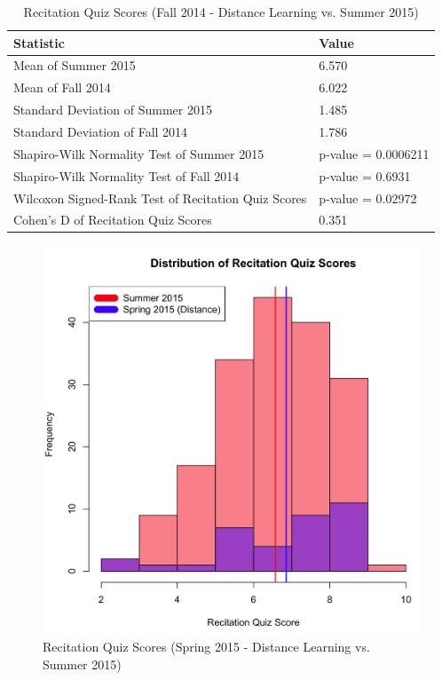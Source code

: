 \begin{small}
\begin{table}
  \centering
  \begin{tabular}{|l|l|}
    \hline
    \textbf{Statistic} & \textbf{Value} \\
	\hline
	Mean of Summer 2015 & 6.570 \\
	\hline
	Mean of Fall 2014 & 6.022 \\
	\hline
	Standard Deviation of Summer 2015 & 1.485 \\
	\hline
	Standard Deviation of Fall 2014 & 1.786 \\
	\hline
	Shapiro-Wilk Normality Test of Summer 2015 & p-value = 0.0006211 \\
	\hline
	Shapiro-Wilk Normality Test of Fall 2014 & p-value = 0.6931 \\
	\hline
	Wilcoxon Signed-Rank Test of Recitation Quiz Scores & p-value = 0.02972 \\
	\hline
	Cohen's D of Recitation Quiz Scores & 0.351 \\
	\hline
  \end{tabular}
	\caption[Recitation Quiz Scores (Fall 2014 - Distance Learning vs. Summer 2015)]{Recitation Quiz Scores (Fall 2014 - Distance Learning vs. Summer 2015)}
  \label{tab:rqf14dSu15}
\end{table}
\end{small}

\begin{figure}
	\centering
	\includegraphics[width=5in]{img/chapter4/rq_su15_vs_sp15d}
	\caption[Recitation Quiz Scores (Spring 2015 - Distance Learning vs. Summer 2015)]{Recitation Quiz Scores (Spring 2015 - Distance Learning vs. Summer 2015)}
  \label{fig:rqsp15dSu15}
\end{figure}

